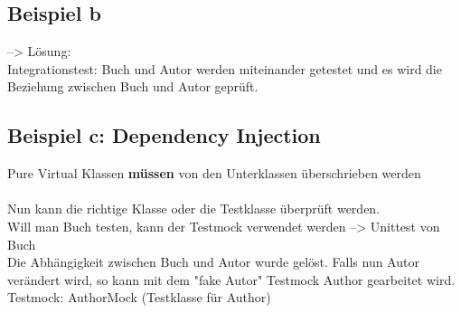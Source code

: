 \subsection{Beispiel b}
--> Lösung: \\
Integrationstest: Buch und Autor werden miteinander getestet und es wird die Beziehung zwischen Buch und Autor geprüft. 

\subsection{Beispiel c: Dependency Injection}
Pure Virtual Klassen \textbf{müssen} von den Unterklassen überschrieben werden \\
 \\
Nun kann die richtige Klasse oder die Testklasse überprüft werden. \\
Will man Buch testen, kann der Testmock verwendet werden --> Unittest von Buch \\
Die Abhängigkeit zwischen Buch und Autor wurde gelöst. 
Falls nun Autor verändert wird, so kann mit dem "fake Autor" Testmock Author gearbeitet wird. \\
Testmock: AuthorMock (Testklasse für Author)

